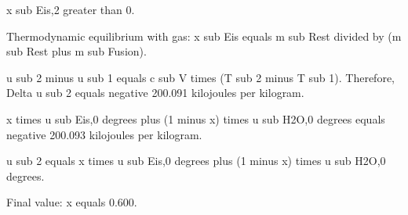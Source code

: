 x sub Eis,2 greater than 0.  

Thermodynamic equilibrium with gas:  
x sub Eis equals m sub Rest divided by (m sub Rest plus m sub Fusion).  

u sub 2 minus u sub 1 equals c sub V times (T sub 2 minus T sub 1).  
Therefore, Delta u sub 2 equals negative 200.091 kilojoules per kilogram.  

x times u sub Eis,0 degrees plus (1 minus x) times u sub H2O,0 degrees equals negative 200.093 kilojoules per kilogram.  

u sub 2 equals x times u sub Eis,0 degrees plus (1 minus x) times u sub H2O,0 degrees.  

Final value: x equals 0.600.